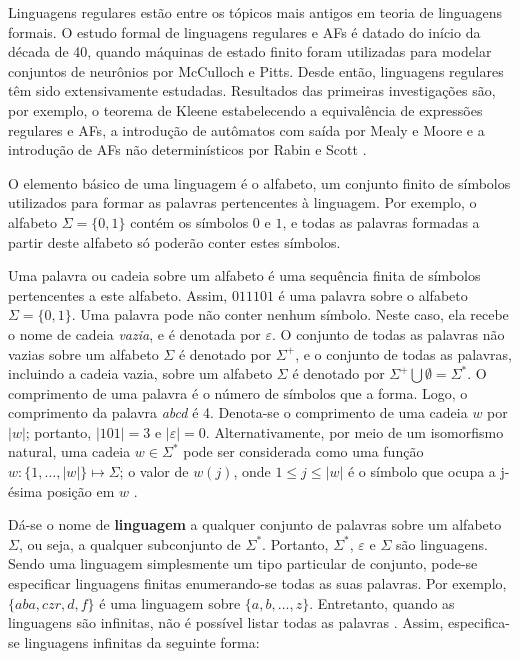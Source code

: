 \documentclass[12pt,a4paper]{article}
\begin{document}
Linguagens regulares estão entre os tópicos mais antigos em teoria de
linguagens formais. O estudo formal de linguagens regulares
e AFs é datado do início da década de 40, quando máquinas
de estado finito foram utilizadas para modelar conjuntos de neurônios
por McCulloch e Pitts. Desde então, linguagens regulares têm sido
extensivamente estudadas. Resultados das primeiras investigações são,
por exemplo, o teorema de Kleene estabelecendo a equivalência de
expressões regulares e AFs, a introdução de autômatos
com saída por Mealy e Moore e a introdução de AFs não
determinísticos por Rabin e Scott .

O elemento básico de uma linguagem é o alfabeto, um conjunto finito de símbolos
utilizados para formar as palavras pertencentes à linguagem. Por exemplo, o
alfabeto $\Sigma = \{0,1\}$ contém os símbolos $0$ e $1$, e todas as palavras
formadas a partir deste alfabeto só poderão conter estes símbolos.

Uma palavra ou cadeia sobre um alfabeto é uma sequência finita de símbolos
pertencentes a este alfabeto. Assim, $011101$ é uma palavra sobre o alfabeto
$\Sigma = \{0, 1\}$. Uma palavra pode não conter nenhum símbolo. Neste caso,
ela recebe o nome de cadeia \textit{vazia}, e é denotada por $\varepsilon$.
O conjunto de todas as palavras não vazias sobre um alfabeto $\Sigma$ é
denotado por $\Sigma^+$, e o conjunto de todas as palavras, incluindo
a cadeia vazia, sobre um alfabeto $\Sigma$ é denotado por
${\Sigma}^+ \bigcup \emptyset = \Sigma^*$. O comprimento de uma palavra
é o número de símbolos que a forma. Logo, o comprimento da palavra
\emph{abcd} é 4. Denota-se o comprimento de uma cadeia $w$ por
$|w|$; portanto, $|101| = 3$ e $|\varepsilon| = 0$. Alternativamente,
por meio de um isomorfismo natural, uma cadeia $w \in \Sigma^*$ pode ser
considerada como uma função $w: \{1,\ldots,|w|\} \mapsto \Sigma$; o
valor de $w(j)$, onde $1 \le j \le |w|$ é o símbolo que ocupa a j-ésima
posição em $w$ .

Dá-se o nome de \textbf{linguagem} a qualquer conjunto de palavras sobre um
alfabeto $\Sigma$, ou seja, a qualquer subconjunto de $\Sigma^*$. Portanto,
$\Sigma^*$, $\varepsilon$ e $\Sigma$ são linguagens. Sendo uma linguagem 
simplesmente um tipo particular de conjunto, pode-se especificar linguagens
finitas enumerando-se todas as suas palavras. Por exemplo, $\{aba, czr, d, f\}$
é uma linguagem sobre $\{a, b, \ldots, z\}$. Entretanto, quando as
linguagens são infinitas, não é possível listar todas as palavras
. Assim, especifica-se linguagens infinitas da seguinte forma:
\end{document}
